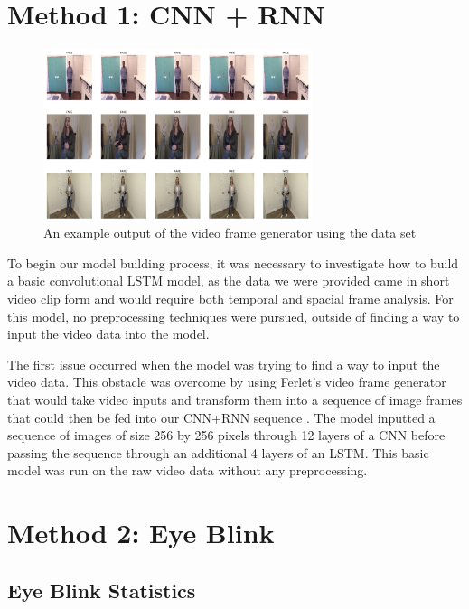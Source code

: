 \documentclass[a4paper]{article}
\begin{document}
\section{Method 1: CNN + RNN}

\begin{figure}[ht]
\centering
\includegraphics[width=0.7\textwidth]{images/frame_generator.png}
\caption{An example output of the video frame generator using the data set}
\label{fig:Frame Generator}
\end{figure}

To begin our model building process, it was necessary to investigate how to build a basic convolutional LSTM model, as the data we were provided came in short video clip form and would require both temporal and spacial frame analysis. For this model, no preprocessing techniques were pursued, outside of finding a way to input the video data into the model.

\par
The first issue occurred when the model was trying to find a way to input the video data. This obstacle was overcome by using Ferlet's video frame generator that would take video inputs and transform them into a sequence of image frames that could then be fed into our CNN+RNN sequence \cite{Frame Generator}. The model inputted a sequence of images of size 256 by 256 pixels through 12 layers of a CNN before passing the sequence through an additional 4 layers of an LSTM. This basic model was run on the raw video data without any preprocessing.

\section{Method 2: Eye Blink}

\subsection{Eye Blink Statistics}
\end{document}
